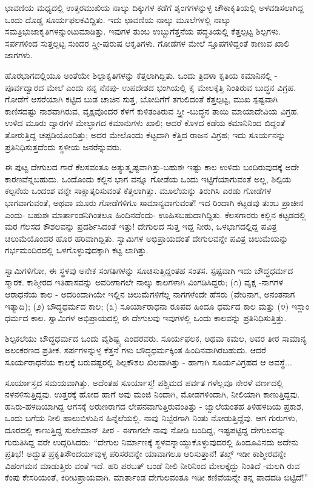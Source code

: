 ಛಾವಣಿಯ ಮಧ್ಯದಲ್ಲಿ ಉತ್ತರಮುಖಿಯ ನಾಲ್ಕು ದಿಕ್ಕುಗಳ ಕಡೆಗೆ ಶೃಂಗಗಳನ್ನುಳ್ಳ ಚೌಕಾಕೃತಿಯಲ್ಲಿ ಅಳವಡಿಸಲಾಗಿದ್ದ ಒಂದು ದೊಡ್ಡ ಸೂರ್ಯಫಲಕವಿದ್ದಿತು. ಇದು ಛಾವಣಿಯ ನಾಲ್ಕು ಮೂಲೆಗಳಲ್ಲಿ ನಾಲ್ಕು ಸಮತ್ರಿಭುಜಾಕೃತಿಗಳನ್ನುಂಟುಮಾಡಿತ್ತು. ಇವುಗಳ ತುಂಬ ಉಬ್ಬುಗೆತ್ತನೆಯ ಪದ್ಧತಿಯಲ್ಲಿ ಕೆತ್ತಲ್ಪಟ್ಟ ಶಿಲ್ಪಗಳು. ಸರ್ಪಗಳಿಂದ ಸುತ್ತಲ್ಪಟ್ಟ ಸುಂದರ ಸ್ತ್ರೀ-ಪುರುಷ ಆಕೃತಿಗಳು. ಗೋಡೆಗಳ ಮೇಲೆ ಸ್ತೂಪಗಳಿದ್ದಂತೆ ಕಾಣುವ ಖಾಲಿ ಜಾಗಗಳು.

ಹೊರಭಾಗದಲ್ಲಿಯೂ ಅಂತೆಯೇ ಶಿಲ್ಪಾಕೃತಿಗಳನ್ನು ಕೆತ್ತಲಾಗಿದ್ದಿತು. ಒಂದು ತ್ರಿದಳಾ ಕೃತಿಯ ಕಮಾನಿನಲ್ಲಿ - ಪೂರ್ವದ್ವಾರದ ಮೇಲೆ ಎಂದು ನನ್ನ ನೆನಪು- ಉಪದೇಶದ ಭಂಗಿಯಲ್ಲಿ ಕೈ ಮೇಲಕ್ಕೆತ್ತಿ ನಿಂತಿರುವ ಬುದ್ಧನ ವಿಗ್ರಹ. ಗೋಡೆಗೆ ಆಸರೆಯಾಗಿ ಕಟ್ಟಿದ ಬುಡ ಚಾಚಿನ ಸುತ್ತ, ಬೋದಿಗೆಗೆ ತಗುಲಿದಂತೆ ಕೆತ್ತಲ್ಪಟ್ಟ, ಮುಖ ಸ್ಪಷ್ಟವಾಗಿ ಕಾಣಿಸದಷ್ಟು ನಾಶವಾಗಿರುವ, ವೃಕ್ಷವೊಂದರ ಕೆಳಗೆ ಕುಳಿತಂತಿರುವ ಸ್ತ್ರೀ -ಬುದ್ಧನ ತಾಯಿ ಮಾಯಾದೇವಿಯ ವಿಗ್ರಹ. ಉಳಿದ ಮೂರು ದ್ವಾರಗಳ ಮೇಲ್ಭಾಗದ ಕಮಾನುಗಳು ಖಾಲಿ; ಆದರೆ ಕೊಳದ ಕಡೆಯ ಕಮಾನಿನಿಂದ ಬಿದ್ದಂತೆ ತೋರುತ್ತಿದ್ದ ಚಪ್ಪಡಿಯೊಂದಿತ್ತು; ಅದರ ಮೇಲೊಂದು ಕೆಟ್ಟದಾಗಿ ಕೆತ್ತಿದ ರಾಜನ ವಿಗ್ರಹ; ಇದು ಸೂರ್ಯನನ್ನು ಪ್ರತಿನಿಧಿಸುತ್ತದೆಂದು ಸ್ಥಳೀಯ ಜನರೆನ್ನುವರು.

ಈ ಪುಟ್ಟ ದೇಗುಲದ ಗಾರೆ ಕೆಲಸವಂತೂ ಅತ್ಯುತ್ಕೃಷ್ಟವಾಗಿತ್ತು-ಬಹುಶಃ ಇಷ್ಟು ಕಾಲ ಉಳಿದು ಬಂದಿರುವುದಕ್ಕೆ ಅದೇ ಕಾರಣವೆನ್ನಬಹುದು. ಒಂದೊಂದು ಕಲ್ಲಿನ ಭಾಗ ವನ್ನೂ ಗೋಡೆಯ ಒಂದು ಇಟ್ಟಿಗೆಯಾಗುವಂತೆ ಅಲ್ಲ, ಶಿಲ್ಪಿಯ ಕಲ್ಪನೆಯ ಒಂದಂಶ ವನ್ನೇ ಸಾಕ್ಷಾತ್ಕರಿಸುವಂತೆ ಕೆತ್ತಲಾಗಿತ್ತು. ಮೂಲೆಯನ್ನು ತಿರುಗಿಸಿ ಎರಡು ಗೋಡೆಗಳ ಭಾಗವಾಗುವಂತೆ, ಅಥವಾ ಮೂರು ಗೋಡೆಗಳಿಗೂ ಸಾಮಾನ್ಯವಾಗುವಂತೆ! ಇದ ರಿಂದಾಗಿ ಕಟ್ಟಡವು ತುಂಬ ಪ್ರಾಚೀನ ಎಂದು- ಬಹುಶಃ ಮಾರ್ತಾಂಡನಿಗಿಂತಲೂ ಹಿಂದಿನದೆಂದು- ಊಹಿಸಬಹುದಾಗಿದ್ದಿತು. ಕೆಲಸಗಾರರು ಕಲ್ಲಿನ ಕಟ್ಟಡದಲ್ಲಿ ಮರ ಗೆಲಸದ ಕೌಶಲವನ್ನು ಪ್ರದರ್ಶಿಸಿದಂತೆ ಇತ್ತು! ದೇಗುಲದ ಸುತ್ತ ಇದ್ದ ನೀರು, ಒಳಭಾಗದಲ್ಲಿದ್ದ ಪವಿತ್ರ ಚಿಲುಮೆಯೊಂದರ ಹೊರ ಹರಿವಾಗಿದ್ದಿತು. ಸ್ವಾಮಿಗಳ ಅಭಿಪ್ರಾಯದಂತೆ ದೇಗುಲವನ್ನೇ ಪವಿತ್ರ ಚಿಲುಮೆಯನ್ನು ಗರ್ಭಮಂದಿರದಲ್ಲಿ ಒಳಗೊಳ್ಳುವುದಕ್ಕಾಗಿ ಕಟ್ಟ ಲಾಗಿತ್ತು.

ಸ್ವಾಮಿಗಳಿಗೋ, ಈ ಸ್ಥಳವು ಅನೇಕ ಸಂಗತಿಗಳನ್ನು ಸೂಚಿಸುತ್ತಿದ್ದಂತಹ ಸಂತಸ. ಸ್ಪಷ್ಟವಾಗಿ ಇದು ಬೌದ್ಧಧರ್ಮದ ಸ್ಮಾರಕ. ಕಾಶ್ಮೀರದ ಇತಿಹಾಸವನ್ನು ಅವರೀಗಾಗಲೇ ನಾಲ್ಕು ಕಾಲಗಳಾಗಿ ವಿಂಗಡಿಸಿದ್ದರು; (೧) ವೃಕ್ಷ -ನಾಗಗಳ ಆರಾಧನೆಯ ಕಾಲ - ಅದರಿಂದಾಗಿಯೇ ಇಲ್ಲಿನ ಚಿಲುಮೆಗಳಿಗೆಲ್ಲ ನಾಗಗಳೆಂದೇ ಹೆಸರು (ವೇರಿನಾಗ, ಅನಂತನಾಗ ಇತ್ಯಾದಿ); (೨) ಬೌದ್ಧಧರ್ಮದ ಕಾಲ; (೩) ಸೂರ್ಯಾರಾಧನಾ ರೂಪದ ಹಿಂದೂ ಧರ್ಮದ ಕಾಲ ಮತ್ತು (೪) ಇಸ್ಲಾಂ ಧರ್ಮದ ಕಾಲ. ಸ್ವಾಮಿಗಳ ಅಭಿಪ್ರಾಯದಲ್ಲಿ ಈ ದೇಗುಲವು ಇವುಗಳಲ್ಲಿ ಒಂದು ಕಾಲವನ್ನು ಪ್ರತಿನಿಧಿಸುತ್ತಿತ್ತು.

ಶಿಲ್ಪಕಲೆಯು ಬೌದ್ಧಧರ್ಮದ ಒಂದು ವೈಶಿಷ್ಟ್ಯ ಎಂದರವರು. ಸೂರ್ಯಫಲಕ, ಅಥವಾ ಕಮಲ, ಅವರ ತೀರ ಸಾಮಾನ್ಯ ಅಲಂಕರಣದ ಪ್ರತೀಕ. ಸರ್ಪಗಳನ್ನುಳ್ಳ ಕೆತ್ತನೆ ಗಳು ಬೌದ್ಧಧರ್ಮಕ್ಕಿಂತ ಹಿಂದಿನವಾಗಿರಬಹುದು. ಆದರೆ ಸೂರ್ಯರಾಧನೆಯ ಕಾಲಕ್ಕೆ ಬರುವಷ್ಟರಲ್ಲಿ ಶಿಲ್ಪಕೌಶಲ ಖಿಲವಾಗಿತ್ತು - ಹಾಗಾಗಿ ಸೂರ್ಯವಿಗ್ರಹದ ಆ ಅವಸ್ಥೆ...

ಸೂರ್ಯಾಸ್ತದ ಸಮಯವಾಗಿತ್ತು. ಅದೆಂತಹ ಸೂರ್ಯಾಸ್ತ! ಪಶ್ಚಿಮದ ಪರ್ವತ ಗಳೆಲ್ಲವೂ ನೇರಳೆ ವರ್ಣದಲ್ಲಿ ನಳನಳಿಸುತ್ತಿದ್ದವು. ಉತ್ತರಕ್ಕೆ ಹೋದ ಹಾಗೆ ಅವು ಮಂಜಿ ನಿಂದಾಗಿ, ಮೋಡಗಳಿಂದಾಗಿ, ನೀಲಿಯಾಗಿ ಕಾಣುತ್ತಿದ್ದವು. ಹಸಿರು-ಹಳದಿಯಾಗಿದ್ದ ಆಗಸಕ್ಕೆ ಅರುಣರಾಗದ ಲೇಪನವಾಗುತ್ತಿರುವಂತಿತ್ತು - ಜ್ವಾಲೆಯಂತಹ ತಿಳಿಹಳದಿಯ ಪ್ರಕಾಶ, ಒಂದು ಬಗೆಯ ನೀಲಿ ಹಾಲುಬಿಳುಪಿನ ಹಿನ್ನೆಲೆಯಲ್ಲಿ. ನಾವು ನಿಬ್ಬೆರಗಾಗಿ ನಿಂತು ನೋಡುತ್ತಿದ್ದೆವು. ಆಗ ಗುರುಗಳು, ದೂರದಲ್ಲಿ ಕಾಣುತ್ತಿದ್ದ ಸುಲೇಮಾನ್ ಪೀಠ - ಈಗಾಗಲೇ ನಾವು ನೋಡಿ ಬಂದಿದ್ದ, ಇಷ್ಟಪಟ್ಟಿದ್ದ ದೇಗುಲವನ್ನು ಗುರುತಿಸಿದ್ದ ವರೇ ಉದ್ಗರಿಸಿದರು: “ದೇಗುಲ ನಿರ್ಮಾಣಕ್ಕೆ ಸ್ಥಳವನ್ನಾಯ್ದುಕೊಳ್ಳುವುದರಲ್ಲಿ ಹಿಂದೂವಿನದು ಅದೇನು ಪ್ರತಿಭೆ! ಅದ್ಭುತ ಪ್ರಕೃತಿಸೌಂದರ್ಯವುಳ್ಳ ಪರಿಸರವನ್ನೇ ಯಾವಾಗಲೂ ಆರಿಸುತ್ತಾನೆ! ತಖ್ತ್ ಇಡೀ ಕಾಶ್ಮೀರವನ್ನೇ ವಿಹಂಗಮನ ಮಾಡುತ್ತಿರು ವಂತೆ ಇದೆ. ಹರಿ ಪರಬತ್ ಬಂಡೆ ನೀಲಿ ನೀರಿನಿಂದ ಮೇಲಕ್ಕೆದ್ದು ನಿಂತಿದೆ -ಮಲಗಿ ರುವ ಕೆಂಪು ಕೇಸರಿಯಂತೆ, ಕಿರೀಟಪ್ರಾಯವಾಗಿ. ಮಾರ್ತಾಂಡ ದೇಗುಲವಂತೂ ಇಡೀ ಕಣಿವೆಯನ್ನೇ ತನ್ನ ಪಾದದಡಿ ಬಿಟ್ಟಿದೆ!”

